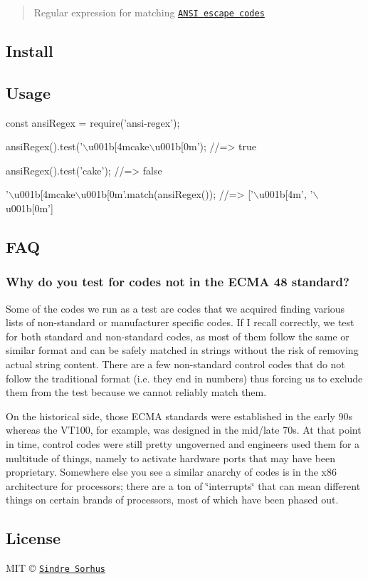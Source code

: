 \begin{quote}
Regular expression for matching \href{http://en.wikipedia.org/wiki/ANSI_escape_code}{\tt A\+N\+SI escape codes} \end{quote}


\subsection*{Install}




\subsection*{Usage}


\begin{DoxyCode}
const ansiRegex = require('ansi-regex');

ansiRegex().test('\(\backslash\)u001b[4mcake\(\backslash\)u001b[0m');
//=> true

ansiRegex().test('cake');
//=> false

'\(\backslash\)u001b[4mcake\(\backslash\)u001b[0m'.match(ansiRegex());
//=> ['\(\backslash\)u001b[4m', '\(\backslash\)u001b[0m']
\end{DoxyCode}


\subsection*{F\+AQ}

\subsubsection*{Why do you test for codes not in the E\+C\+MA 48 standard?}

Some of the codes we run as a test are codes that we acquired finding various lists of non-\/standard or manufacturer specific codes. If I recall correctly, we test for both standard and non-\/standard codes, as most of them follow the same or similar format and can be safely matched in strings without the risk of removing actual string content. There are a few non-\/standard control codes that do not follow the traditional format (i.\+e. they end in numbers) thus forcing us to exclude them from the test because we cannot reliably match them.

On the historical side, those E\+C\+MA standards were established in the early 90\textquotesingle{}s whereas the V\+T100, for example, was designed in the mid/late 70\textquotesingle{}s. At that point in time, control codes were still pretty ungoverned and engineers used them for a multitude of things, namely to activate hardware ports that may have been proprietary. Somewhere else you see a similar \textquotesingle{}anarchy\textquotesingle{} of codes is in the x86 architecture for processors; there are a ton of \char`\"{}interrupts\char`\"{} that can mean different things on certain brands of processors, most of which have been phased out.

\subsection*{License}

M\+IT © \href{http://sindresorhus.com}{\tt Sindre Sorhus} 